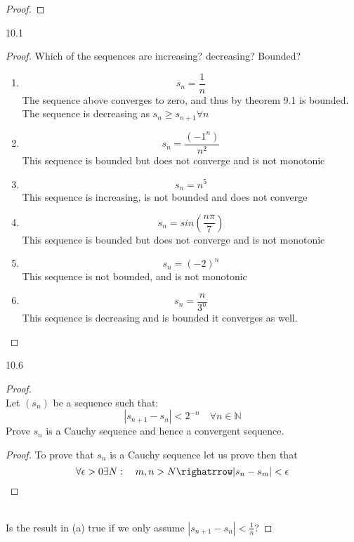 \documentclass[11pt]{article}
\theoremstyle{definition}  %
\newcommand{\nlim}{\lim_{n\rightarrow \infty}}
\begin{document}
\begin{enumerate}
\begin{proof}
\begin{enumerate}
      \item
      \textbf{What is  $\nlim(\sum_{k=0}^na^k), a\geq 1}$}
      \begin{align*}
        &\nlim \left(\frac{1}{1-a}-\frac{1-a^{n+1}}{{1-a}}\right)\\
        &\left(\frac{1}{1-a}-\frac{\nlim1-a^{n+1}}{{1-a}}\right)\\
        &\left(\frac{1}{1-a}-\frac{\infty}{{1-a}}\right)=\infty\\
      \end{align*}
    \end{enumerate}
  \end{proof}
  \item 10.1
  \begin{proof}
    Which of the sequences are increasing? decreasing? Bounded?
    \begin{enumerate}
      \item
      \[
        s_n=\frac{1}{n}
      \]
      The sequence above converges to zero, and thus by theorem 9.1 is bounded. The sequence is decreasing as $s_n \geq s_{n+1} \forall n$
      \item
      \[
        s_n=\frac{(-1^n)}{n^2}
      \]
      This sequence is bounded but does not converge and is not monotonic
      \item
      \[
        s_n=n^5
      \]
      This sequence is increasing, is not bounded and does not converge
      \item
      \[
        s_n=sin(\frac{n\pi}{7})
      \]
      This sequence is bounded but does not converge and is not monotonic
      \item
      \[
        s_n=(-2)^n
      \]
      This sequence is not bounded, and is not monotonic
      \item
      \[
        s_n=\frac{n}{3^n}
      \]
      This sequence is decreasing and is bounded it converges as well.
    \end{enumerate}
  \end{proof}
  \item 10.6
  \begin{proof}
    \item\\
    Let $(s_n)$ be a sequence such that:
    \[
      |s_{n+1}-s_n|<2^{-n} \quad \forall n\in \mathbb{N}
    \]
    Prove $s_n$ is a Cauchy sequence and hence a convergent sequence.
    \begin{proof}
    To prove that $s_n$ is a Cauchy sequence let us prove then that \[
      \forall \epsilon>0 \exists N: \quad m,n>N \righatrrow |s_n-s_m|<\epsilon
    \]
    \end{proof}
    \item\\
    Is the result in (a) true if we only assume $|s_{n+1}-s_n|<\frac{1}{n}$?
  \end{proof}
\end{enumerate}
\end{document}
